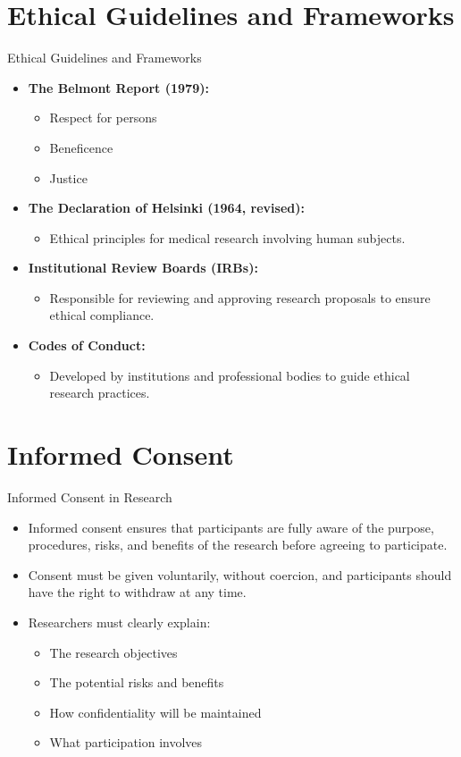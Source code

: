 \documentclass{beamer}
\begin{document}
	\section{Ethical Guidelines and Frameworks}
	\begin{frame}{Ethical Guidelines and Frameworks}
		\begin{itemize}
			\item \textbf{The Belmont Report (1979):}
			\begin{itemize}
				\item Respect for persons
				\item Beneficence
				\item Justice
			\end{itemize}
			\item \textbf{The Declaration of Helsinki (1964, revised):}
			\begin{itemize}
				\item Ethical principles for medical research involving human subjects.
			\end{itemize}
			\item \textbf{Institutional Review Boards (IRBs):}
			\begin{itemize}
				\item Responsible for reviewing and approving research proposals to ensure ethical compliance.
			\end{itemize}
			\item \textbf{Codes of Conduct:}
			\begin{itemize}
				\item Developed by institutions and professional bodies to guide ethical research practices.
			\end{itemize}
		\end{itemize}
	\end{frame}
	
	\section{Informed Consent}
	\begin{frame}{Informed Consent in Research}
		\begin{itemize}
			\item Informed consent ensures that participants are fully aware of the purpose, procedures, risks, and benefits of the research before agreeing to participate.
			\item Consent must be given voluntarily, without coercion, and participants should have the right to withdraw at any time.
			\item Researchers must clearly explain:
			\begin{itemize}
				\item The research objectives
				\item The potential risks and benefits
				\item How confidentiality will be maintained
				\item What participation involves
			\end{itemize}
		\end{itemize}
	\end{frame}
	
\end{document}
